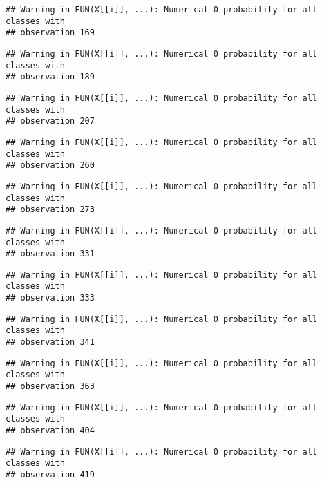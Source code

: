 \documentclass[]{article}
\begin{document}
\begin{verbatim}
## Warning in FUN(X[[i]], ...): Numerical 0 probability for all classes with
## observation 169
\end{verbatim}

\begin{verbatim}
## Warning in FUN(X[[i]], ...): Numerical 0 probability for all classes with
## observation 189
\end{verbatim}

\begin{verbatim}
## Warning in FUN(X[[i]], ...): Numerical 0 probability for all classes with
## observation 207
\end{verbatim}

\begin{verbatim}
## Warning in FUN(X[[i]], ...): Numerical 0 probability for all classes with
## observation 260
\end{verbatim}

\begin{verbatim}
## Warning in FUN(X[[i]], ...): Numerical 0 probability for all classes with
## observation 273
\end{verbatim}

\begin{verbatim}
## Warning in FUN(X[[i]], ...): Numerical 0 probability for all classes with
## observation 331
\end{verbatim}

\begin{verbatim}
## Warning in FUN(X[[i]], ...): Numerical 0 probability for all classes with
## observation 333
\end{verbatim}

\begin{verbatim}
## Warning in FUN(X[[i]], ...): Numerical 0 probability for all classes with
## observation 341
\end{verbatim}

\begin{verbatim}
## Warning in FUN(X[[i]], ...): Numerical 0 probability for all classes with
## observation 363
\end{verbatim}

\begin{verbatim}
## Warning in FUN(X[[i]], ...): Numerical 0 probability for all classes with
## observation 404
\end{verbatim}

\begin{verbatim}
## Warning in FUN(X[[i]], ...): Numerical 0 probability for all classes with
## observation 419
\end{verbatim}
\end{document}
